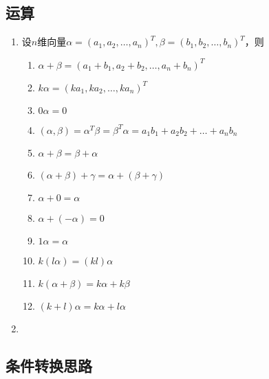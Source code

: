 \documentclass[a4paper,12pt]{article}
\begin{document}
\begin{enumerate}
    \end{enumerate}

    \subsection{运算}

    \begin{enumerate}
        \item 设$n$维向量$\alpha = (a_1, a_2, \dots, a_n)^T, \beta= (b_1, b_2, \dots, b_n)^T$，则
        \begin{enumerate}
            \item $\alpha + \beta = (a_1 + b_1, a_2 + b_2, \dots, a_n + b_n)^T$
            \item $k\alpha = (ka_1, ka_2, \dots, ka_n)^T$
            \item $0\alpha = 0$
            \item $(\alpha, \beta) = \alpha^T\beta = \beta^T\alpha = a_{1}b_{1} + a_{2}b_{2} + \dots + a_{n}b_{n}$
            \item $\alpha + \beta = \beta + \alpha$
            \item $(\alpha + \beta) + \gamma = \alpha + (\beta + \gamma)$
            \item $\alpha + 0 = \alpha $
            \item $\alpha + (-\alpha) = 0$
            \item $1\alpha = \alpha$
            \item $k(l\alpha) = (kl)\alpha$
            \item $k(\alpha + \beta) = k\alpha + k\beta$
            \item $(k + l)\alpha = k\alpha + l\alpha$
        \end{enumerate}
        \item
    \end{enumerate}

    \subsection{条件转换思路}
\end{document}

